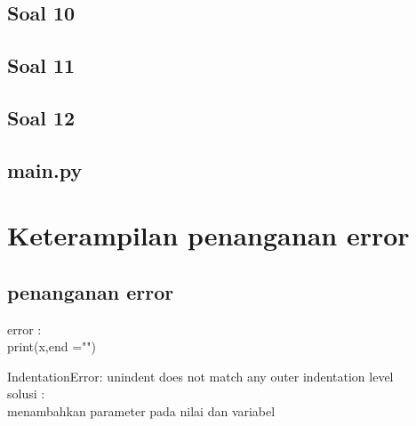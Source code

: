 \documentclass[a4paper,12pt]{report}
\begin{document}
\section*{Soal 10}

\section*{Soal 11}

\section*{Soal 12}

\section*{main.py}


\chapter{Keterampilan penanganan error}
\section*{penanganan error}
error :\\
print(x,end ="")
                    
IndentationError: unindent does not match any outer indentation level\\
solusi :\\
menambahkan parameter pada nilai dan variabel
\end{document}

